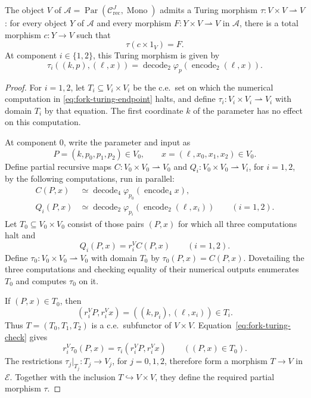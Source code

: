 \begin{theorem}\label{thm:fork-turing}
The object $V$ of
$\mathcal A=\operatorname{Par}(\mathcal C_{\mathrm{rec}}^J,
\operatorname{Mono})$ admits a Turing morphism
$\tau:V\times V\rightharpoonup V$: for every object $Y$ of
$\mathcal A$ and every morphism $F:Y\times V\rightharpoonup V$
in $\mathcal A$, there is a total morphism
$c:Y\to V$ such that
\[
 \tau(c\times1_V)=F.
\]
At component $i\in\{1,2\}$, this Turing morphism is given by
\begin{equation}\label{eq:fork-turing-endpoint}
 \tau_i((k,p),(\ell,x))
 =\operatorname{decode}_2
     \varphi_p(\operatorname{encode}_2(\ell,x)).
\end{equation}
\end{theorem}

\begin{proof}
For $i=1,2$, let $T_i\subseteq V_i\times V_i$ be the c.e.\ set
on which the numerical computation in
\eqref{eq:fork-turing-endpoint} halts, and define
$\tau_i:V_i\times V_i\rightharpoonup V_i$ with domain $T_i$
by that equation. The first coordinate $k$
of the parameter has no effect on this computation.

At component $0$, write the parameter and input as
\[
 P=(k,p_0,p_1,p_2)\in V_0,
 \qquad x=(\ell,x_0,x_1,x_2)\in V_0.
\]
Define partial recursive maps
$C:V_0\times V_0\rightharpoonup V_0$ and
$Q_i:V_0\times V_0\rightharpoonup V_i$, for $i=1,2$,
by the following computations, run in parallel:
\begin{align*}
 C(P,x)&\simeq
   \operatorname{decode}_4
      \varphi_{p_0}(\operatorname{encode}_4 x),\\
 Q_i(P,x)&\simeq
   \operatorname{decode}_2
      \varphi_{p_i}(\operatorname{encode}_2(\ell,x_i))
      \qquad(i=1,2).
\end{align*}
Let $T_0\subseteq V_0\times V_0$ consist of those pairs $(P,x)$
for which all three computations halt and
\begin{equation}\label{eq:fork-turing-check}
 Q_i(P,x)=r_i^V C(P,x)\qquad(i=1,2).
\end{equation}
Define $\tau_0:V_0\times V_0\rightharpoonup V_0$ with domain
$T_0$ by $\tau_0(P,x)=C(P,x)$.
Dovetailing the three computations and checking equality of their
numerical outputs enumerates $T_0$ and computes $\tau_0$ on it.

If $(P,x)\in T_0$, then
\[
 (r_i^V P,r_i^V x)=((k,p_i),(\ell,x_i))\in T_i.
\]
Thus $T=(T_0,T_1,T_2)$ is a c.e.\ subfunctor of $V\times V$.
Equation~\eqref{eq:fork-turing-check} gives
\[
 r_i^V\tau_0(P,x)
   =\tau_i(r_i^V P,r_i^V x)
 \qquad((P,x)\in T_0).
\]
The restrictions $\tau_j|_{T_j}:T_j\to V_j$, for $j=0,1,2$,
therefore form a morphism $T\to V$ in $\mathcal E$.
Together with the inclusion $T\hookrightarrow V\times V$,
they define the required partial morphism $\tau$.


\end{proof}
